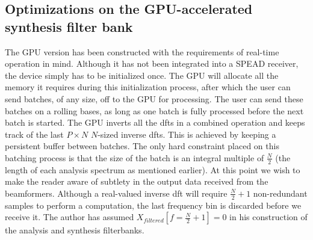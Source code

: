 \documentclass[a4paper,10pt]{article}
\begin{document}
\subsection{Optimizations on the GPU-accelerated synthesis filter bank}
The GPU version has been constructed with the requirements of real-time operation in mind. Although it has not been integrated into a SPEAD receiver, the device simply has
to be initialized once. The GPU will allocate all the memory it requires during this initialization process, after which the user can send batches, of any size, 
off to the GPU for processing. The user can send these batches on a rolling bases, as long as one batch is fully processed before the next batch is started. The GPU inverts 
all the \gls{dft}s in a combined operation and keeps track of the last $P\times N$ $N$-sized inverse \gls{dft}s. This is achieved by keeping a persistent buffer between batches. 
The only hard constraint placed on this batching process is that the size of the batch is an integral multiple of $\frac{N}{2}$ (the length of each analysis spectrum as mentioned earlier). At 
this point we wish to make the reader aware of subtlety in the output data received from the beamformers. Although a real-valued inverse \gls{dft} will require $\frac{N}{2}+1$ non-redundant 
samples to perform a computation, the last frequency bin is discarded before we receive it. The author has assumed $X_{filtered}[f=\frac{N}{2}+1] = 0$ in his construction 
of the analysis and synthesis filterbanks.
\end{document}
